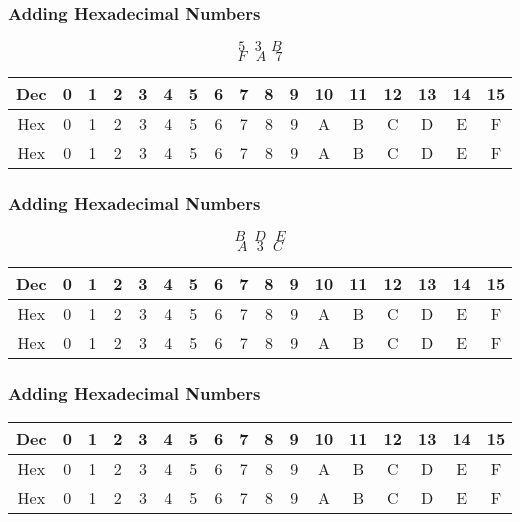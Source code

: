 \documentclass{beamer}
\begin{document}
\begin{frame}
\frametitle{Adding Hexadecimal Numbers}
\vspace{-2cm}
\huge
\[ 5 \mbox{     } 3  \mbox{     } B\]
\[ F \mbox{     } A  \mbox{     } 7\]
\vspace{3cm}
\small
\begin{tabular}{|c|c|c|c|c|c|c|c|c|c|c|c|c|c|c|c|c|}
\hline
\textbf{Dec} & 0	&	1	&	2	&	3	&	4	&	5	&	6	&	7	&	8	&	9	&	10	&	11	&	12	&	13	&	14	&	15	\\ \hline
\hline
Hex & 0	&	1	&	2	&	3	&	4	&	5	&	6	&	7	&	8	&	9	&	A	&	B	&	C	&	D	&	E	&	F	\\ \hline
Hex & 0	&	1	&	2	&	3	&	4	&	5	&	6	&	7	&	8	&	9	&	A	&	B	&	C	&	D	&	E	&	F	\\ \hline 
\end{tabular} 
\end{frame}

\begin{frame}
\frametitle{Adding Hexadecimal Numbers}
\vspace{-2cm}
\huge
\[ B \mbox{     } D  \mbox{     } E\]
\[ A \mbox{     } 3  \mbox{     } C\]
\vspace{3cm}
\small
\begin{tabular}{|c|c|c|c|c|c|c|c|c|c|c|c|c|c|c|c|c|}
\hline
\textbf{Dec} & 0	&	1	&	2	&	3	&	4	&	5	&	6	&	7	&	8	&	9	&	10	&	11	&	12	&	13	&	14	&	15	\\ \hline
\hline
Hex & 0	&	1	&	2	&	3	&	4	&	5	&	6	&	7	&	8	&	9	&	A	&	B	&	C	&	D	&	E	&	F	\\ \hline
Hex & 0	&	1	&	2	&	3	&	4	&	5	&	6	&	7	&	8	&	9	&	A	&	B	&	C	&	D	&	E	&	F	\\ \hline 
\end{tabular} 
\end{frame}
\begin{frame}
\frametitle{Adding Hexadecimal Numbers}\small
\begin{tabular}{|c|c|c|c|c|c|c|c|c|c|c|c|c|c|c|c|c|}
\hline
\textbf{Dec} & 0	&	1	&	2	&	3	&	4	&	5	&	6	&	7	&	8	&	9	&	10	&	11	&	12	&	13	&	14	&	15	\\ \hline

Hex & 0	&	1	&	2	&	3	&	4	&	5	&	6	&	7	&	8	&	9	&	A	&	B	&	C	&	D	&	E	&	F	\\ \hline
Hex & 0	&	1	&	2	&	3	&	4	&	5	&	6	&	7	&	8	&	9	&	A	&	B	&	C	&	D	&	E	&	F	\\ \hline 
\end{tabular} 
\end{frame}
\end{document}
